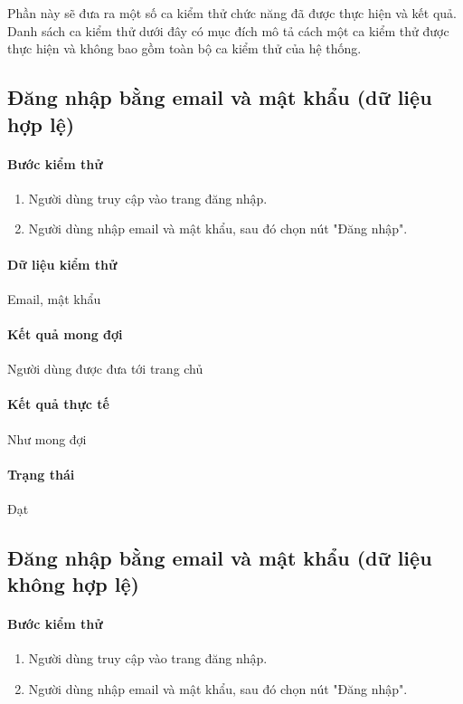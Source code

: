 \documentclass[./../main.tex]{subfiles}
\begin{document}
Phần này sẽ đưa ra một số ca kiểm thử chức năng đã được thực hiện và kết quả. Danh sách ca kiểm thử dưới đây có mục đích mô tả cách một ca kiểm thử được thực hiện và không bao gồm toàn bộ ca kiểm thử của hệ thống.

\subsection{Đăng nhập bằng email và mật khẩu (dữ liệu hợp lệ)}

\paragraph*{Bước kiểm thử}

\begin{enumerate}
    \item Người dùng truy cập vào trang đăng nhập.
    \item Người dùng nhập email và mật khẩu, sau đó chọn nút "Đăng nhập".
\end{enumerate}

\paragraph*{Dữ liệu kiểm thử} Email, mật khẩu

\paragraph*{Kết quả mong đợi} Người dùng được đưa tới trang chủ

\paragraph*{Kết quả thực tế} Như mong đợi

\paragraph*{Trạng thái} Đạt

\subsection{Đăng nhập bằng email và mật khẩu (dữ liệu không hợp lệ)}

\paragraph*{Bước kiểm thử}

\begin{enumerate}
    \item Người dùng truy cập vào trang đăng nhập.
    \item Người dùng nhập email và mật khẩu, sau đó chọn nút "Đăng nhập".
\end{enumerate}
\end{document}
